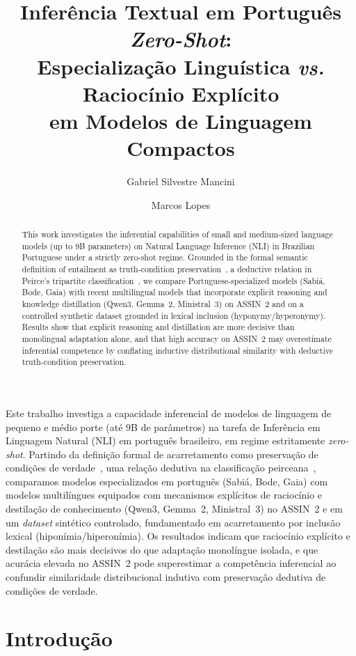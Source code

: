 \documentclass[12pt]{article}
\title{Inferência Textual em Português \emph{Zero-Shot}:\\
Especialização Linguística \emph{vs.} Raciocínio Explícito\\
em Modelos de Linguagem Compactos}
\author{Gabriel Silvestre Mancini\inst{1} \and Marcos Lopes\inst{1}}
\begin{document}
\maketitle

\begin{abstract}
This work investigates the inferential capabilities of small and medium-sized
language models (up to 9B parameters) on Natural Language Inference (NLI) in
Brazilian Portuguese under a strictly zero-shot regime. Grounded in the formal
semantic definition of entailment as truth-condition preservation~\cite{Ferreira2019}, a deductive relation in Peirce's tripartite classification~\cite{peirce_cp2},
we compare Portuguese-specialized models (Sabiá, Bode, Gaia) with recent
multilingual models that incorporate explicit reasoning and knowledge distillation
(Qwen3, Gemma~2, Ministral~3) on ASSIN~2 and on a controlled synthetic dataset
grounded in lexical inclusion (hyponymy/hyperonymy). Results show that explicit
reasoning and distillation are more decisive than monolingual adaptation alone,
and that high accuracy on ASSIN~2 may overestimate inferential competence by
conflating inductive distributional similarity with deductive truth-condition
preservation.
\end{abstract}

\begin{resumo}
Este trabalho investiga a capacidade inferencial de modelos de linguagem de
pequeno e médio porte (até 9B de parâmetros) na tarefa de Inferência em
Linguagem Natural (NLI) em português brasileiro, em regime estritamente
\emph{zero-shot}. Partindo da definição formal de acarretamento como
preservação de condições de verdade~\cite{Ferreira2019}, uma relação
dedutiva na classificação peirceana~\cite{peirce_cp2}, comparamos modelos
especializados em português (Sabiá, Bode, Gaia) com modelos multilíngues
equipados com mecanismos explícitos de raciocínio e destilação de conhecimento
(Qwen3, Gemma~2, Ministral~3) no ASSIN~2 e em um \emph{dataset} sintético
controlado, fundamentado em acarretamento por inclusão lexical
(hiponímia/hiperonímia). Os resultados indicam que raciocínio explícito e
destilação são mais decisivos do que adaptação monolíngue isolada, e que
acurácia elevada no ASSIN~2 pode superestimar a competência inferencial ao
confundir similaridade distribucional indutiva com preservação dedutiva de
condições de verdade.
\end{resumo}

\section{Introdução}
\end{document}
